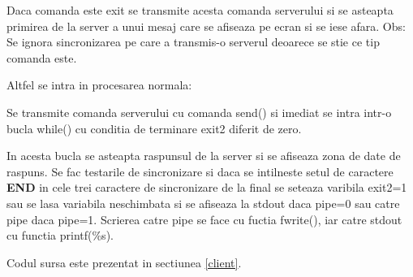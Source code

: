 Daca comanda este exit se transmite acesta comanda serverului si se asteapta
primirea de la server a unui mesaj care se afiseaza pe ecran si se iese
afara. Obs: Se ignora sincronizarea pe care a transmis-o serverul deoarece
se stie ce tip comanda este.

Altfel se intra in procesarea normala:

Se transmite comanda serverului cu comanda send() si imediat se intra
intr-o bucla while() cu conditia de terminare exit2 diferit de zero.

In acesta bucla se asteapta raspunsul de la server si se afiseaza zona de
date de raspuns. Se fac testarile de sincronizare si daca se intilneste
setul de caractere {\bf END} in cele trei caractere de sincronizare de la
final se seteaza varibila exit2=1 sau se lasa variabila neschimbata si se
afiseaza la stdout daca pipe=0 sau catre pipe daca pipe=1. Scrierea catre
pipe se face cu fuctia fwrite(), iar catre stdout cu functia printf(\%s).

Codul sursa este prezentat in sectiunea \ref{client}.